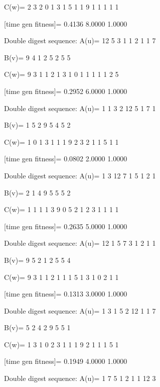 C(w)=
     2     3     2     0     1     3     1     5     1     1     9     1     1     1     1     1

[time gen fitness]=
    0.4136    8.0000    1.0000

Double digest sequence:
A(u)=
    12     5     3     1     1     2     1     1     7

B(v)=
     9     4     1     2     5     2     5     5

C(w)=
     9     3     1     1     2     1     3     1     0     1     1     1     1     1     2     5

[time gen fitness]=
    0.2952    6.0000    1.0000

Double digest sequence:
A(u)=
     1     1     3     2    12     5     1     7     1

B(v)=
     1     5     2     9     5     4     5     2

C(w)=
     1     0     1     3     1     1     1     9     2     3     2     1     1     5     1     1

[time gen fitness]=
    0.0802    2.0000    1.0000

Double digest sequence:
A(u)=
     1     3    12     7     1     5     1     2     1

B(v)=
     2     1     4     9     5     5     5     2

C(w)=
     1     1     1     1     3     9     0     5     2     1     2     3     1     1     1     1

[time gen fitness]=
    0.2635    5.0000    1.0000

Double digest sequence:
A(u)=
    12     1     5     7     3     1     2     1     1

B(v)=
     9     5     2     1     2     5     5     4

C(w)=
     9     3     1     1     2     1     1     1     5     1     3     1     0     2     1     1

[time gen fitness]=
    0.1313    3.0000    1.0000

Double digest sequence:
A(u)=
     1     3     1     5     2    12     1     1     7

B(v)=
     5     2     4     2     9     5     5     1

C(w)=
     1     3     1     0     2     3     1     1     1     9     2     1     1     1     5     1

[time gen fitness]=
    0.1949    4.0000    1.0000

Double digest sequence:
A(u)=
     1     7     5     1     2     1     1    12     3

